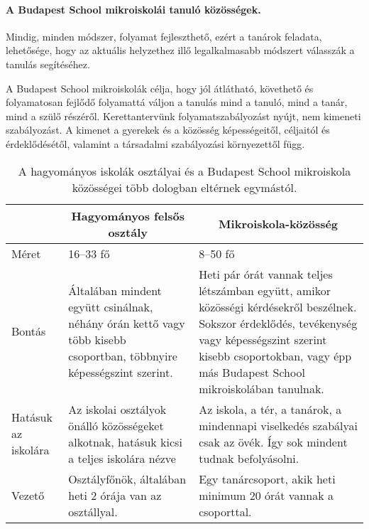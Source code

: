   \paragraph{A Budapest School mikroiskolái tanuló közösségek.} Mindig, minden módszer,
  folyamat fejleszthető, ezért a tanárok feladata, lehetősége, hogy az aktuális
  helyzethez illő legalkalmasabb módszert válasszák a tanulás segítéséhez.

  A Budapest School mikroiskolák célja, hogy jól átlátható, követhető és
  folyamatosan fejlődő folyamattá váljon a tanulás mind a tanuló, mind a tanár, mind
  a szülő részéről. Kerettantervünk folyamatszabályozást nyújt, nem kimeneti
  szabályozást. A kimenet a gyerekek és a közösség képességeitől, céljaitól és érdeklődésétől,
  valamint a társadalmi szabályozási környezettől függ.


  \begin{table}
  \centering
\begin{tabular}{@{}p{2cm}|p{4cm}|p{4cm}@{}}


 & \multicolumn{1}{c|}{\textbf{Hagyományos felsős osztály}}  & \multicolumn{1}{c}{\textbf{ Mikroiskola-közösség}}
 \\ \hline
Méret & 16–33 fő & 8–50 fő \\ \hline
  Bontás &
  Általában mindent együtt csinálnak, néhány órán kettő vagy több kisebb
  csoportban, többnyire képességszint szerint. &
  Heti pár órát vannak teljes létszámban együtt, amikor közösségi
  kérdésekről beszélnek. Sokszor érdeklődés, tevékenység vagy képességszint
  szerint kisebb csoportokban, vagy épp más Budapest School
  mikroiskolában tanulnak. \\ \hline
Hatásuk az iskolára & Az iskolai osztályok önálló közösségeket alkotnak, hatásuk
kicsi a teljes iskolára nézve & Az iskola, a tér, a tanárok,
a mindennapi viselkedés szabályai csak az övék.
Így sok mindent tudnak befolyásolni. \\ \hline
Vezető & Osztályfőnök, általában heti 2 órája van az osztállyal. &
Egy tanárcsoport, akik heti minimum 20 órát vannak a csoporttal. \\
\end{tabular}
\caption{A hagyományos iskolák osztályai és a Budapest School mikroiskola közösségei több dologban eltérnek egymástól.}

\label{my-label}

\end{table}


